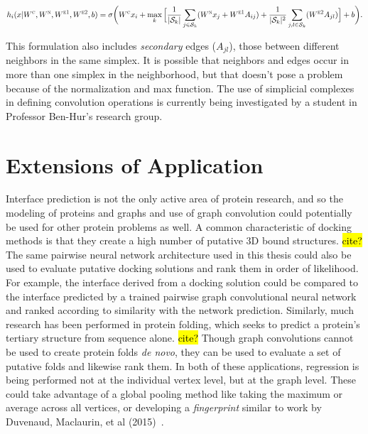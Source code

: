 \begin{equation}
h_i(x |  W^{\textsc{c}}, W^{\textsc{n}}, W^{\textsc{e1}}, W^{\textsc{e2}}, b) = \sigma \bigg( W^{\textsc{c}} x_i + \max_{k} \Big[ \frac{1}{|\mathcal{S}_k|}  \sum_{j \in \mathcal{S}_k} ( W^{\textsc{n}} x_j + W^{\textsc{e1}} A_{ij} ) + \frac{1}{|\mathcal{S}_k|^{2}}\sum_{j, l \in \mathcal{S}_k} (W^{\textsc{e2}} A_{jl}) \Big] + b \bigg).
\label{eq:simplicial_complex_conv}
\end{equation}

\noindent
This formulation also includes \emph{secondary} edges ($A_{jl}$), those between different neighbors in the same simplex.
It is possible that neighbors and edges occur in more than one simplex in the neighborhood, but that doesn't pose a problem because of the normalization and max function.
The use of simplicial complexes in defining convolution operations is currently being investigated by a student in Professor Ben-Hur's research group.


\section{Extensions of Application}

Interface prediction is not the only active area of protein research, and so the modeling of proteins and graphs and use of graph convolution could potentially be used for other protein problems as well.
A common characteristic of docking methods is that they create a high number of putative 3D bound structures. \hl{cite?}
The same pairwise neural network architecture used in this thesis could also be used to evaluate putative docking solutions and rank them in order of likelihood.
For example, the interface derived from a docking solution could be compared to the interface predicted by a trained pairwise graph convolutional neural network and ranked according to similarity with the network prediction.
Similarly, much research has been performed in protein folding, which seeks to predict a protein's tertiary structure from sequence alone. \hl{cite?}
Though graph convolutions cannot be used to create protein folds \emph{de novo}, they can be used to evaluate a set of putative folds and likewise rank them.
In both of these applications, regression is being performed not at the individual vertex level, but at the graph level.
These could take advantage of a global pooling method like taking the maximum or average across all vertices, or developing a \emph{fingerprint} similar to work by Duvenaud, Maclaurin, et al (2015)~\cite{duvenaud2015}.

